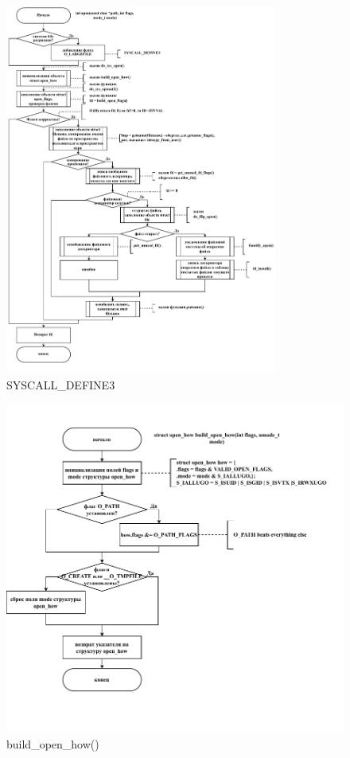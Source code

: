 \begin{figure}[ht]
	\centering
	\includegraphics[width=0.8\textwidth]{img/main.pdf}
	\caption{SYSCALL\_DEFINE3}
\end{figure}

\begin{figure}[ht]
	\centering
	\includegraphics[width=\textwidth]{img/build_open_how.pdf}
	\caption{build\_open\_how()}
\end{figure}

